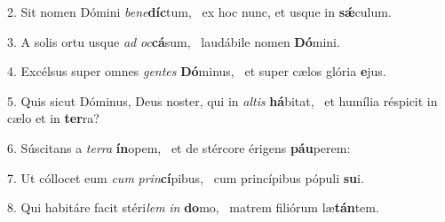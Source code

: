 2. Sit nomen Dómini \textit{be}\textit{ne}\textbf{díc}tum, \ast\  ex hoc nunc, et usque in \textbf{sǽ}culum.\

3. A solis ortu usque \textit{ad} \textit{oc}\textbf{cá}sum, \ast\  laudábile nomen \textbf{Dó}mini.\

4. Excélsus super omnes \textit{gen}\textit{tes} \textbf{Dó}minus, \ast\  et super cælos glória \textbf{e}jus.\

5. Quis sicut Dóminus, Deus noster, qui in \textit{al}\textit{tis} \textbf{há}bitat, \ast\  et humília réspicit in cælo et in \textbf{ter}ra?\

6. Súscitans a \textit{ter}\textit{ra} \textbf{ín}opem, \ast\  et de stércore érigens \textbf{páu}perem:\

7. Ut cóllocet eum \textit{cum} \textit{prin}\textbf{cí}pibus, \ast\  cum princípibus pópuli \textbf{su}i.\

8. Qui habitáre facit stéri\textit{lem} \textit{in} \textbf{do}mo, \ast\  matrem filiórum læ\textbf{tán}tem.\

